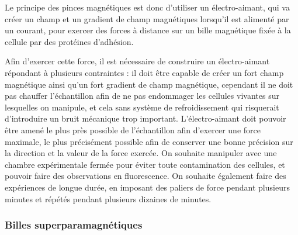 Le principe des pinces magnétiques est donc d'utiliser un électro-aimant, qui va créer un champ et un gradient de champ magnétiques lorsqu'il est alimenté par un courant, pour exercer des forces à distance sur un bille magnétique fixée à la cellule par des protéines d'adhésion. 	 
	 
	 
	 Afin d'exercer cette force, il est nécessaire de construire un électro-aimant répondant à plusieurs contraintes : il doit être capable de créer un fort champ magnétique ainsi qu'un fort gradient de champ magnétique, cependant il ne doit pas chauffer l'échantillon afin de ne pas endommager les cellules vivantes sur lesquelles on manipule, et cela sans système de refroidissement qui risquerait d'introduire un bruit mécanique trop important. L'électro-aimant doit pouvoir être amené le plus près possible de l'échantillon afin d'exercer une force maximale, le plus précisément possible afin de conserver une bonne précision sur la direction et la valeur de la force exercée. On souhaite manipuler avec une chambre expérimentale fermée pour éviter toute contamination des cellules, et pouvoir faire des observations en fluorescence. On souhaite également faire des expériences de longue durée, en imposant des paliers de force pendant plusieurs minutes et répétés pendant plusieurs dizaines de minutes.	
	
		\subsubsection{Billes superparamagnétiques}
		
